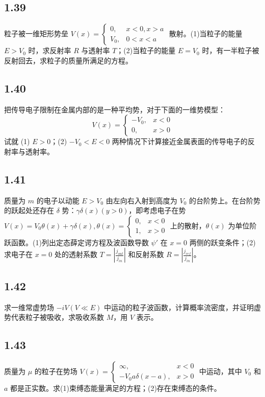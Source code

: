 \subsection{1.39}
粒子被一维矩形势垒 $V(x) = \begin{cases}
0, & x<0, x>a \\
V_0, & 0<x<a
\end{cases}$ 散射。(1)当粒子的能量 $E > V_0$ 时，求反射率 $R$ 与透射率 $T$；(2)当粒子的能量 $E = V_0$ 时，有一半粒子被反射回去，求粒子的质量所满足的方程。

\subsection{1.40}
把传导电子限制在金属内部的是一种平均势，对于下面的一维势模型：
$$V(x) = 
\begin{cases} 
-V_0, & x < 0 \\ 
0, & x > 0 
\end{cases}$$
试就 (1) $E > 0$；(2) $-V_0 < E < 0$ 两种情况下计算接近金属表面的传导电子的反射率与透射率。

\subsection{1.41}
质量为 $m$ 的电子以动能 $E > V_0$ 由左向右入射到高度为 $V_0$ 的台阶势上。在台阶势的跃起处还存在 $\delta$ 势：$\gamma \delta(x)(y > 0)$，即考虑电子在势 $V(x) = V_0 \theta(x) + \gamma \delta(x), \theta(x) = \begin{cases}
0, & x < 0 \\
1, & x > 0
\end{cases}$ 上的散射，$\theta(x)$ 为单位阶跃函数。(1)列出定态薛定谔方程及波函数导数 $\psi'$ 在 $x = 0$ 两侧的跃变条件；(2)求电子在 $x = 0$ 处的透射系数 $T = \left| \frac{j_{out}}{j_{in}} \right|$ 和反射系数 $R = \left| \frac{j_{ref}}{j_{in}} \right|$。

\subsection{1.42}
求一维常虚势场 $-iV(V \ll E)$ 中运动的粒子波函数，计算概率流密度，并证明虚势代表粒子被吸收，求吸收系数 $M$，用 $V$ 表示。

\subsection{1.43}
质量为 $\mu$ 的粒子在势场 $V(x) = \begin{cases}
\infty, & x < 0 \\
-V_0 a \delta (x-a), & x > 0
\end{cases}$ 中运动，其中 $V_0$ 和 $a$ 都是正实数。求(1)束缚态能量满足的方程；(2)存在束缚态的条件。


